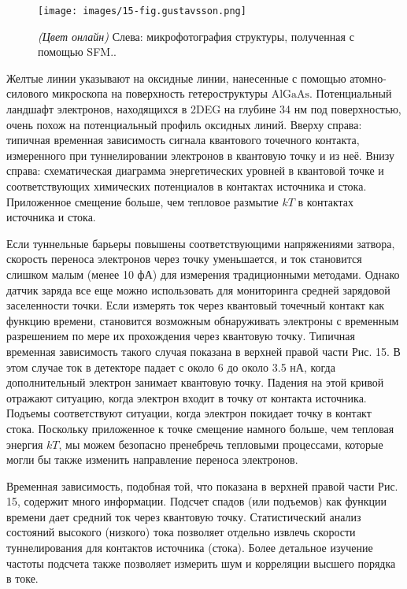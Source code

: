 \documentclass[a4paper,14pt]{extarticle}
\begin{document}
\begin{figure}[htbp]
    \centering
    \texttt{[image: images/15-fig.gustavsson.png]}
    \caption{\label{fig:gustavsson1} \textit{(Цвет онлайн)} Слева: микрофотография структуры, полученная с помощью SFM.\cite{gustavsson}.}
\end{figure}

Желтые линии указывают на оксидные линии, нанесенные с помощью атомно-силового микроскопа на поверхность гетероструктуры \(\text{AlGaAs}\). Потенциальный ландшафт электронов, находящихся в 2DEG на глубине 34 нм под поверхностью, очень похож на потенциальный профиль оксидных линий. Вверху справа: типичная временная зависимость сигнала квантового точечного контакта, измеренного при туннелировании электронов в квантовую точку и из неё. Внизу справа: схематическая диаграмма энергетических уровней в квантовой точке и соответствующих химических потенциалов в контактах источника и стока. Приложенное смещение больше, чем тепловое размытие \(kT\) в контактах источника и стока.

Если туннельные барьеры повышены соответствующими напряжениями затвора, скорость переноса электронов через точку уменьшается, и ток становится слишком малым (менее 10 фА) для измерения традиционными методами. Однако датчик заряда все еще можно использовать для мониторинга средней зарядовой заселенности точки. Если измерять ток через квантовый точечный контакт как функцию времени, становится возможным обнаруживать электроны с временным разрешением по мере их прохождения через квантовую точку. Типичная временная зависимость такого случая показана в верхней правой части Рис. 15. В этом случае ток в детекторе падает с около 6 до около 3.5 нА, когда дополнительный электрон занимает квантовую точку. Падения на этой кривой отражают ситуацию, когда электрон входит в точку от контакта источника. Подъемы соответствуют ситуации, когда электрон покидает точку в контакт стока. Поскольку приложенное к точке смещение намного больше, чем тепловая энергия \(kT\), мы можем безопасно пренебречь тепловыми процессами, которые могли бы также изменить направление переноса электронов.

Временная зависимость, подобная той, что показана в верхней правой части Рис. 15, содержит много информации. Подсчет спадов (или подъемов) как функции времени дает средний ток через квантовую точку. Статистический анализ состояний высокого (низкого) тока позволяет отдельно извлечь скорости туннелирования для контактов источника (стока). Более детальное изучение частоты подсчета также позволяет измерить шум и корреляции высшего порядка в токе.
\end{document}
